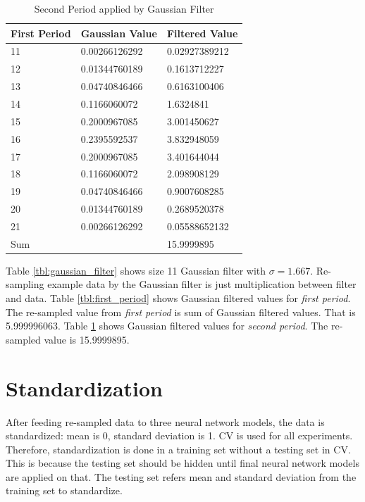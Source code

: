 \documentclass[draft,dvipsnames]{drexel-thesis}
\begin{document}
\begin{thesis}
\begin{table}[!t]
\centering
\caption{Second Period applied by Gaussian Filter}
\label{tbl:second_period}
\begin{tabular}{|l|l|l|}
\hline
First Period & Gaussian Value & Filtered Value \\ \hline
11           & 0.00266126292  & 0.02927389212  \\
12           & 0.01344760189  & 0.1613712227   \\
13           & 0.04740846466  & 0.6163100406   \\
14           & 0.1166060072   & 1.6324841      \\
15           & 0.2000967085   & 3.001450627    \\
16           & 0.2395592537   & 3.832948059    \\
17           & 0.2000967085   & 3.401644044    \\
18           & 0.1166060072   & 2.098908129    \\
19           & 0.04740846466  & 0.9007608285   \\
20           & 0.01344760189  & 0.2689520378   \\
21           & 0.00266126292  & 0.05588652132  \\ \hline
\multicolumn{2}{|l|}{Sum}     & 15.9999895     \\ \hline
\end{tabular}
\end{table}

Table \ref{tbl:gaussian_filter} shows size 11 Gaussian filter with $\sigma=1.667$. Re-sampling example data by the Gaussian filter is just multiplication between filter and data. Table \ref{tbl:first_period} shows Gaussian filtered values for {\em first period}. The re-sampled value from {\em first period} is sum of Gaussian filtered values. That is 5.999996063. Table \ref{tbl:second_period} shows Gaussian filtered values for {\em second period}. The re-sampled value is 15.9999895.


\section{Standardization}
After feeding re-sampled data to three neural network models, the data is standardized: mean is 0, standard deviation is 1. CV is used for all experiments. Therefore, standardization is done in a training set without a testing set in CV. This is because the testing set should be hidden until final neural network models are applied on that. The testing set refers mean and standard deviation from the training set to standardize.



\end{thesis}
\end{document}
